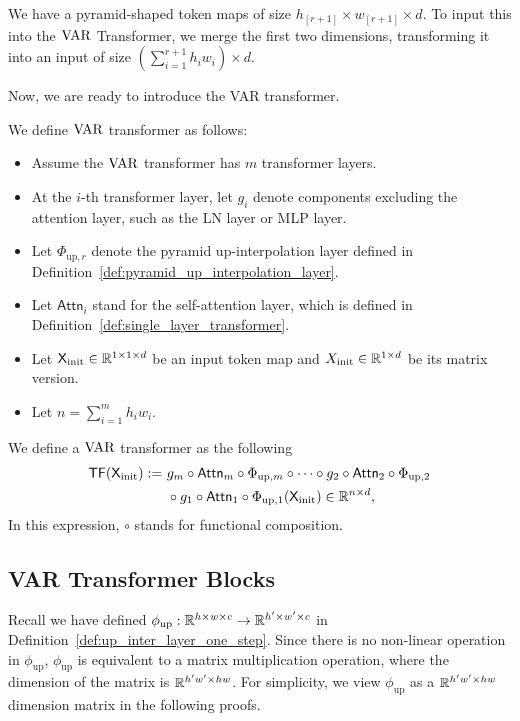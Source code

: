 \begin{remark}
    We have a pyramid-shaped token maps of size $ h_{[r+1]} \times w_{[r+1]} \times d $. To input this into the $\mathrm{VAR}$ Transformer, we merge the first two dimensions, transforming it into an input of size $ (\sum_{i=1}^{r+1} h_i w_i) \times d $. 
\end{remark}

Now, we are ready to introduce the VAR transformer. 
\begin{definition}\label{def:var_transformer}
We define $\mathrm{VAR}$ transformer as follows:
\begin{itemize}
    \item Assume the $\mathrm{VAR}$ transformer has $m$ transformer layers.
    \item At the $i$-th transformer layer, let $g_i$ denote components excluding the attention layer, such as the LN layer or MLP layer.
    
    \item Let $\Phi_{\mathrm{up},r}$ denote the pyramid up-interpolation layer defined in Definition~\ref{def:pyramid_up_interpolation_layer}.
    \item  Let $\mathsf{Attn}_i$ stand for the self-attention layer, which is defined in Definition~\ref{def:single_layer_transformer}.
    \item Let $\mathsf{X}_{\mathrm{init}} \in \mathbb{R}^{1 \times 1 \times d}$ be an input token map and $X_{\mathrm{init}} \in \mathbb{R}^{1 \times d}$ be its matrix version.
    \item Let $n = \sum_{i=1}^m h_i w_i$.
\end{itemize}
     We define a $\mathrm{VAR}$ transformer as the following
\begin{align*}
    \mathsf{TF}(\mathsf{X}_{ \mathrm{init} }) := 
    & ~ g_m \circ \mathsf{Attn}_m \circ \Phi_{ \mathrm{up}, m} \circ \cdots \circ g_2 \circ \mathsf{Attn}_2 \circ \Phi_{ \mathrm{up}, 2} \\
    & ~ \circ g_1 \circ \mathsf{Attn}_1 \circ \Phi_{ \mathrm{up}, 1} (\mathsf{X}_{ \mathrm{init} }) \in \mathbb{R}^{n \times d},
\end{align*}
In this expression, $\circ$ stands for functional composition.
\end{definition}


\subsection{VAR Transformer Blocks}\label{sec:var_transformer}

Recall we have defined $\phi_{\mathrm{up}}: \mathbb{R}^{h \times w \times c} \to \mathbb{R}^{h' \times w' \times c}$ in Definition~\ref{def:up_inter_layer_one_step}. Since there is no non-linear operation in $\phi_{\mathrm{up}}$, $\phi_{\mathrm{up}}$ is equivalent to a matrix multiplication operation, where the dimension of the matrix is $\mathbb{R}^{h'w' \times hw}$. For simplicity, we view $\phi_{\mathrm{up}}$ as a $\mathbb{R}^{h'w' \times hw}$ dimension matrix in the following proofs. 


